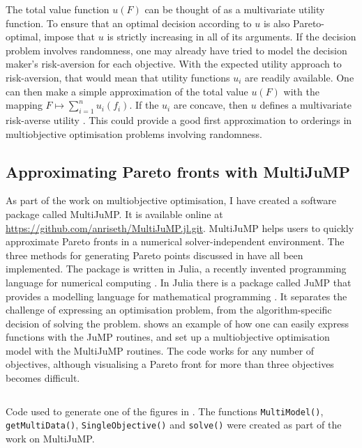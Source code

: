 \documentclass[main.tex]{subfiles}
\begin{document}
The total value function $u(F)$ can be thought of as a
multivariate utility function. To ensure that an optimal decision
according to $u$ is also Pareto-optimal, impose that $u$ is
strictly increasing in all of its arguments.
If the decision problem involves randomness, one may already have
tried to model the decision maker's risk-aversion for each objective.
With the expected utility approach to risk-aversion, that would mean
that utility functions $u_i$ are readily available. One can then make
a simple approximation of
the total value $u(F)$ with the mapping $F\mapsto \sum_{i=1}^n u_i(f_i)$.
If the $u_i$ are concave, then $u$ defines a multivariate risk-averse
utility \citep[Sec. 2.3.2]{campi2011multivariate}.
This could provide a good first approximation to orderings in
multiobjective optimisation problems involving randomness.


\subsection{Approximating Pareto fronts with
  MultiJuMP}\label{sec:multi_multijump}
As part of the work on multiobjective optimisation, I
have created a software package called MultiJuMP.
It is available online at
\url{https://github.com/anriseth/MultiJuMP.jl.git}.
MultiJuMP helps users to quickly approximate Pareto fronts in a
numerical solver-independent environment.
The three methods for generating Pareto points discussed
in  have all been implemented.
The package is written in Julia, a recently invented
programming language for numerical computing \citep{bezanson2017julia}.
In Julia there is a package called JuMP that provides a modelling
language for mathematical programming \citep{dunning2017jump}. It
separates the challenge of
expressing an optimisation problem, from the algorithm-specific
decision of solving the problem.  shows an example
of how one can easily express functions with the JuMP routines, and
set up a multiobjective optimisation model with the MultiJuMP
routines. The code works for any number of objectives, although visualising
a Pareto front for more than three objectives becomes difficult.

\begin{listing}[htbp]
  \inputminted{julia}{./include/multijump.jl}
  \caption{Code used to generate one of the figures in
    .
    The functions \texttt{MultiModel()},
    \texttt{getMultiData()},
    \texttt{SingleObjective()} and \texttt{solve()}
    were created as part of the work on MultiJuMP.
  }\label{lst:multijump}
\end{listing}




\biblio{} %
\end{document}
